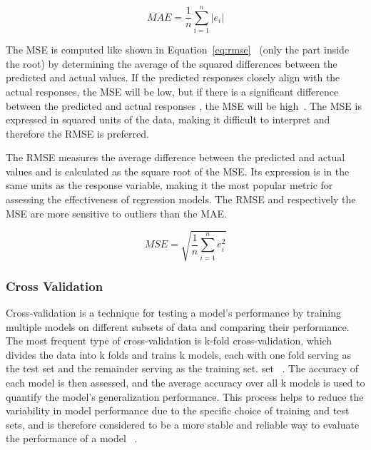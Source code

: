 \begin{tcolorbox}[arc=0pt,boxrule=0.5pt]
    \begin{equation}
        MAE = \frac{1}{n} \sum_{i=1}^{n} |e_i|
        \label{eq:mae}
    \end{equation}
\end{tcolorbox}

The MSE is computed like shown in Equation~\ref{eq:rmse}~\cite[p. 1248]{chai2014root} (only the part inside the root) by
determining the average of the squared differences between the predicted and actual values.
If the predicted responses closely align with the actual responses, the MSE will be low, but if there is a significant
difference between the predicted and actual responses , the MSE will be high~\cite[p. 30]{hastie2009elements}.
The MSE is expressed in squared units of the data, making it difficult to interpret and therefore the RMSE is preferred.

The RMSE measures the average difference between the predicted and actual values and is calculated as the square root
of the MSE.
Its expression is in the same units as the response variable, making it the most popular metric for assessing the
effectiveness of regression models.
The RMSE and respectively the MSE are more sensitive to outliers than the MAE.

\begin{tcolorbox}[arc=0pt,boxrule=0.5pt]
    \begin{equation}
        \label{eq:rmse}
        MSE = \sqrt{\frac{1}{n} \sum_{i=1}^{n} e_i^2}
    \end{equation}
\end{tcolorbox}

\subsubsection{Cross Validation}\label{subsubsec:cross-validation}
Cross-validation is a technique for testing a model's performance by training multiple models on different subsets of
data and comparing their performance.
The most frequent type of cross-validation is k-fold cross-validation, which divides the data into k folds and trains
k models, each with one fold serving as the test set and the remainder serving as the training set.
set
~\cite[p. 252--260]{muller_introductionmachinelearning_2016}.
The accuracy of each model is then assessed, and the average accuracy over all k models is used to quantify the model's
generalization performance.
This process helps to reduce the variability in model performance due to the specific choice of training and test
sets, and is therefore considered to be a more stable and reliable way to evaluate the performance of a
model
~\cite[p. 252--260]{muller_introductionmachinelearning_2016}.


